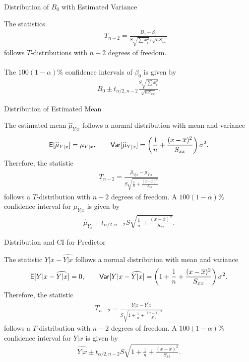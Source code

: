 \begin{frame}{Distribution of $B_0$ with Estimated Variance}

\justifying
{} The statistics
\begin{align*}
\qquad T_{n-2} = \frac{B_0-\beta_0}{S\sqrt{\sum x_i^2}/\sqrt{nS_{xx}}}
\end{align*}
follows $T$-distributions with $n-2$ degrees of freedom. \\
~\\
 The $100(1-\alpha)\%$ confidence intervals of $\beta_0$ is given by
\begin{align*}
B_0 \pm t_{\alpha/2,n-2}\frac{S\sqrt{\sum x_i^2}}{\sqrt{nS_{xx}}}.
\end{align*}

\end{frame}


\begin{frame}{Distribution of Estimated Mean}

\justifying
{} The estimated mean $\widehat{\mu}_{Y|x}$ follows a normal distribution with mean and variance
\begin{align*}
\mathsf{E}[\widehat{\mu}_{Y|x}] = \mu_{Y|x}, \qquad \mathsf{Var}[\widehat{\mu}_{Y|x}] = \left(\frac{1}{n} + \frac{(x-\overline{x})^2}{S_{xx}}\right)\sigma^2.
\end{align*}
Therefore, the statistic
\begin{align*}
T_{n-2} = \frac{\widehat{\mu}_{Y|x} - \mu_{Y|x}}{S\sqrt{\frac{1}{n}+\frac{(x-\overline{x})^2}{S_{xx}}}}
\end{align*}
follows a $T$-distribution with $n-2$ degrees of freedom. A $100(1-\alpha)\%$ confidence interval for $\mu_{Y|x}$ is given by
\begin{align*}
\widehat{\mu}_{Y_x} \pm t_{\alpha/2,n-2}S\sqrt{\frac{1}{n}+\frac{(x-\overline{x})^2}{S_{xx}}}.
\end{align*}

\end{frame}

\begin{frame}{Distribution and CI for Predictor}

\justifying
{} The statistic $Y|x - \widehat{Y|x}$ follows a normal distribution with mean and variance
\begin{align*}
\mathsf{E}[Y|x - \widehat{Y|x}] = 0, \qquad\mathsf{Var}[Y|x - \widehat{Y|x}] = \left(1 +  \frac{1}{n} + \frac{(x-\overline{x})^2}{S_{xx}} \right)\sigma^2.
\end{align*}
Therefore, the statistic
\begin{align*}
T_{n-2} = \frac{Y|x - \widehat{Y|x}}{S\sqrt{1+\frac{1}{n}+\frac{(x-\overline{x})^2}{S_{xx}}}}
\end{align*}
follows a $T$-distribution with $n-2$ degrees of freedom. A $100(1-\alpha)\%$ confidence interval for $Y|x$ is given by
\begin{align*}
\widehat{Y|x} \pm t_{\alpha/2,n-2} S\sqrt{1+\frac{1}{n}+\frac{(x-\overline{x})^2}{S_{xx}} }.
\end{align*}

\end{frame}


